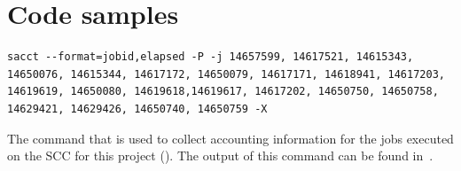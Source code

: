 \documentclass[12pt, a4paper, hidelinks]{article}
\begin{document}
\inputminted[xleftmargin=1em,linenos,fontsize=\small, breaklines]{python}{./assets/scap_gtx1080_deepspeed_14615344_4294967294_one-epoch.txt}

\section{Code samples}

\begin{listing}[H]
\begin{verbatim}
sacct --format=jobid,elapsed -P -j 14657599, 14617521, 14615343, 14650076, 14615344, 14617172, 14650079, 14617171, 14618941, 14617203, 14619619, 14650080, 14619618,14619617, 14617202, 14650750, 14650758, 14629421, 14629426, 14650740, 14650759 -X
        \end{verbatim}
\caption[Sacct command]{The command that is used to collect accounting information for the jobs executed on the \ac{SCC} for this project (). The output of this command can be found in~.}
\label{lst:sacct_command}
\end{listing}
\end{document}

